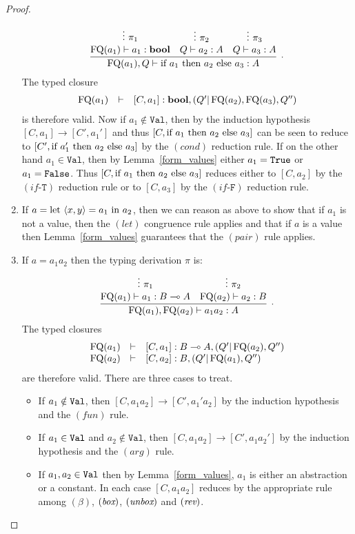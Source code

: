 \documentclass[twoside]{article}
\begin{document}
\begin{proof}
\begin{enumerate}
  \[
  \infer[.]{\FQ(a_1),Q\entails \ifthenelse{a_1}{a_2}{a_3}:A}{
    \deduce[]{\FQ(a_1)\entails a_1:\bool }{
      \vdots~\pi_1
    }
    &
    \deduce[]{Q \entails a_2:A}{
      \vdots~\pi_2
    }    
    &
    \deduce[]{Q \entails a_3:A}{
      \vdots~\pi_3
    }    
  }
  \]  
  The typed closure
  \[
  \begin{array}{rcl}
  \mathop{\textrm{FQ}}\nolimits(a_1) & \vdash & [C,a_1]:\textrm{\bf bool},(Q'|\mathop{\textrm{FQ}}\nolimits(a_2),\mathop{\textrm{FQ}}\nolimits(a_3),Q'')
  \end{array}
  \]
  is therefore valid. Now if $a_1\notin\mathtt{Val}$, then by the induction hypothesis 
  $[C,a_1]\to[C',a_1']$ and thus $[C,\textrm{\rm if}~ a_1 ~\textrm{\rm then}~ a_2 ~\textrm{\rm else}~ a_3]$ can
  be seen to reduce
  to $[C',\textrm{\rm if}~ a_1' ~\textrm{\rm then}~ a_2 ~\textrm{\rm else}~ a_3]$ by the $(cond)$ reduction rule. 
  If on the other hand $a_1\in\mathtt{Val}$, then by 
  Lemma~\hyperref[form_values]{\ref*{form_values}} either $a_1=\texttt{True}$ or $a_1=\texttt{False}$. 
  Thus $[C,\textrm{\rm if}~ a_1 ~\textrm{\rm then}~ a_2 ~\textrm{\rm else}~ a_3]$ reduces either to $[C,a_2]$ by the 
  $(if\mbox{-}\mathtt{T})$ reduction rule or 
  to $[C,a_3]$ by the $(if\mbox{-}\mathtt{F})$ reduction rule.
  \item If $a=\textrm{\rm let}~ \langle x,y\rangle = a_1 ~\textrm{\rm in}~ a_2$, then we can reason as above to show that 
  if $a_1$ is not a value, then the $(let)$ congruence rule applies and that if 
  $a$ is a value then Lemma~\hyperref[form_values]{\ref*{form_values}} 
  guarantees that the $(pair)$ rule applies.
  \item If $a=a_1a_2$ then the typing derivation $\pi$ is: 
  \[
    \infer[.]{\FQ(a_1),\FQ(a_2)\entails a_1a_2:A}{
      \deduce[]{\FQ(a_1)\entails a_1:B\loli A}{
        \vdots~\pi_1
      }
      &
      \deduce[]{\FQ(a_2)\entails a_2:B}{
        \vdots~\pi_2
      }      
    }
  \]  
  The typed closures
  \[
  \begin{array}{rcl}
  \mathop{\textrm{FQ}}\nolimits(a_1) & \vdash & [C,a_1]:B\multimap A,(Q'|\mathop{\textrm{FQ}}\nolimits(a_2),Q'')\\
  \mathop{\textrm{FQ}}\nolimits(a_2) & \vdash & [C,a_2]:B, (Q'|\mathop{\textrm{FQ}}\nolimits(a_1),Q'')
  \end{array}
  \]
  are therefore valid. There are three cases to treat.
  \begin{itemize}
    \item If $a_1\notin\texttt{Val}$, then $[C,a_1a_2]\to[C',a_1'a_2]$
    by the induction hypothesis and the $(fun)$ rule.
    \item If $a_1\in\texttt{Val}$ and $a_2\notin\mathtt{Val}$, then 
    $[C,a_1a_2]\to[C',a_1a_2']$ by the induction hypothesis and 
    the $(arg)$ rule.
    \item If $a_1,a_2\in\texttt{Val}$ then by 
    Lemma~\hyperref[form_values]{\ref*{form_values}}, $a_1$ is either 
    an abstraction or a constant. In each case $[C,a_1a_2]$ reduces 
    by the appropriate rule among $(\beta)$, $(\mathop{\textit{box}}\nolimits)$, $(\mathop{\textit{unbox}}\nolimits)$ 
    and $(\mathop{\textit{rev}}\nolimits)$. 
  \end{itemize}
\end{enumerate}
\end{proof}
\end{document}
